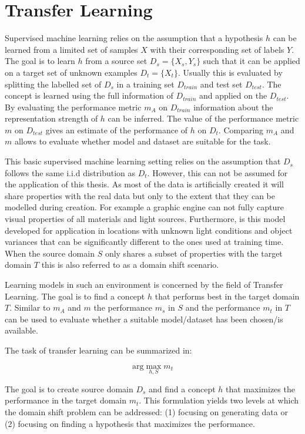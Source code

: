 \chapter{Transfer Learning}
\label{sec:training}

Supervised machine learning relies on the assumption that a hypothesis $h$ can be learned from a limited set of samples $X$ with their corresponding set of labels $Y$. The goal is to learn $h$ from a source set $D_s = \{X_{s},Y_{s}\}$ such that it can be applied on a target set of unknown examples $D_t = \{X_{t}\}$. Usually this is evaluated by splitting the labelled set of $D_s$ in a training set $D_{train}$ and test set $D_{test}$. The concept is learned using the full information of $D_{train}$ and applied on the $D_{test}$. By evaluating the performance metric $m_A$ on $D_{train}$ information about the representation strength of $h$ can be inferred. The value of the performance metric $m$ on $D_{test}$ gives an estimate of the performance of $h$ on $D_t$. Comparing $m_A$ and $m$ allows to evaluate whether model and dataset are suitable for the task.
			
This basic supervised machine learning setting relies on the assumption that $D_s$ follows the same i.i.d distribution as $D_t$. However, this can not be assumed for the application of this thesis. As most of the data is artificially created it will share properties with the real data but only to the extent that they can be modelled during creation. For example a graphic engine can not fully capture visual properties of all materials and light sources. Furthermore, is this model developed for application in locations with unknown light conditions and object variances that can be significantly different to the ones used at training time. When the source domain $S$ only shares a subset of properties with the target domain $T$ this is also referred to as a domain shift scenario. 


Learning models in such an environment is concerned by the field of Transfer Learning. The goal is to find a concept $h$ that performs best in the target domain $T$. Similar to $m_A$ and $m$ the performance $m_s$ in $S$ and the performance $m_t$ in $T$ can be used to evaluate whether a suitable model/dataset has been chosen/is available.

The task of transfer learning can be summarized in:

$$
\text{arg}\max\limits_{h,S} m_t
$$

The goal is to create source domain $D_s$ and find a concept $h$ that maximizes the performance in the target domain $m_t$. This formulation yields two levels at which the domain shift problem can be addressed: (1) focusing on generating data or (2) focusing on finding a hypothesis that maximizes the performance.

